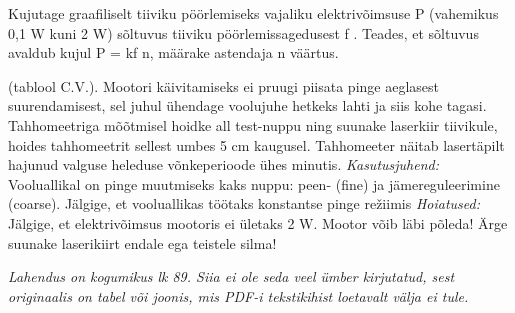 
Kujutage graafiliselt tiiviku pöörlemiseks vajaliku elektrivõimsuse P (vahemikus 0,1 W kuni 2 W) sõltuvus tiiviku pöörlemissagedusest f . Teades, et sõltuvus avaldub kujul P = kf n, määrake astendaja n väärtus.

(tablool C.V.). Mootori käivitamiseks ei pruugi piisata pinge aeglasest suurendamisest, sel juhul ühendage voolujuhe hetkeks lahti ja siis kohe tagasi. Tahhomeetriga mõõtmisel hoidke all test-nuppu ning suunake laserkiir tiivikule, hoides tahhomeetrit sellest umbes 5 cm kaugusel. Tahhomeeter näitab lasertäpilt hajunud valguse heleduse võnkeperioode ühes minutis.
\textit{Kasutusjuhend:} Vooluallikal on pinge muutmiseks kaks nuppu: peen- (fine) ja jämereguleerimine (coarse). Jälgige, et vooluallikas töötaks konstantse pinge režiimis
\textit{Hoiatused:} Jälgige, et elektrivõimsus mootoris ei ületaks 2 W. Mootor võib läbi põleda! Ärge suunake laserikiirt endale ega teistele silma!

\hint

\solu
\textit{Lahendus on kogumikus lk 89. Siia ei ole seda veel ümber kirjutatud, sest originaalis on tabel või joonis, mis PDF-i tekstikihist loetavalt välja ei tule.}
\probend
